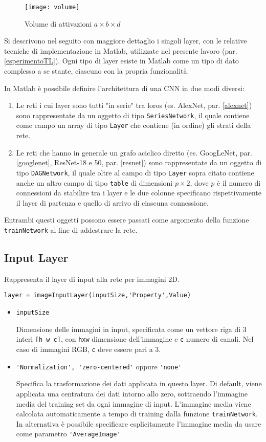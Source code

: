 \begin{figure}[h!]
\centering
\texttt{[image: volume]}
\caption{Volume di attivazioni $a\times b\times d$}
\label{fig:volume}
\end{figure}


Si descrivono nel seguito con maggiore dettaglio i singoli layer, con le relative tecniche di implementazione in Matlab, utilizzate nel presente lavoro (par. \ref{esperimentoTL}).
Ogni tipo di layer esiste in Matlab come un tipo di dato complesso a se stante, ciascuno con la propria funzionalità.

In Matlab è possibile definire l'architettura di una CNN in due modi diversi:
\begin{enumerate}
\item Le reti i cui layer sono tutti "in serie" tra loros (es. AlexNet, par. \ref{alexnet}) sono rappresentate da un oggetto di tipo \verb|SeriesNetwork|, il quale contiene come campo un array di tipo \verb|Layer| che contiene (in ordine) gli strati della rete.
\item Le reti che hanno in generale un grafo aciclico diretto (es. GoogLeNet, par. \ref{googlenet}, ResNet-18 e 50, par. \ref{resnet}) sono rappresentate da un oggetto di tipo \verb|DAGNetwork|, il quale oltre al campo di tipo \verb|Layer| sopra citato contiene anche un altro campo di tipo \verb|table| di dimensioni $p\times 2$, dove $p$ è il numero di connessioni da stabilire tra i layer e le due colonne specificano rispettivamente il layer di partenza e quello di arrivo di ciascuna connessione.
\end{enumerate}

Entrambi questi oggetti possono essere passati come argomento della funzione \verb|trainNetwork| al fine di addestrare la rete.

\subsection{Input Layer}
\label{INPUT}
Rappresenta il layer di input alla rete per immagini 2D.
\begin{verbatim}
layer = imageInputLayer(inputSize,'Property',Value)
\end{verbatim}
\begin{itemize}
	\item \verb|inputSize| 
	
	Dimensione delle immagini in input, specificata come un vettore riga di 3 interi \verb|[h w c]|, con \verb|hxw| dimensione dell'immagine e \verb|c| numero di canali. Nel caso di immagini RGB, \verb|c| deve essere pari a 3.
	
	\item \verb|'Normalization', 'zero-centered'| oppure \verb|'none'|
	
	Specifica la trasformazione dei dati applicata in questo layer. Di default, viene applicata una centratura dei dati intorno allo zero, sottraendo l'immagine media del training set da ogni immagine di input. L'immagine media viene calcolata automaticamente a tempo di training dalla funzione \verb|trainNetwork|. In alternativa è possibile specificare esplicitamente l'immagine media da usare come parametro \verb|'AverageImage'| 
\end{itemize}

